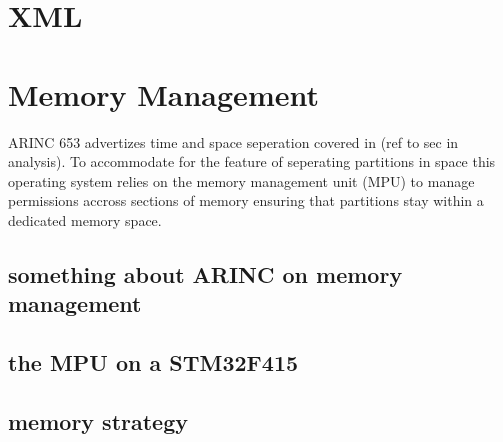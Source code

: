 \section{XML}


\section{Memory Management}
ARINC 653 advertizes time and space seperation covered in (ref to sec in analysis).
To accommodate for the feature of seperating partitions in space
this operating system relies on the memory management unit (MPU)
to manage permissions accross sections of memory
ensuring that partitions stay within a dedicated memory space.

\subsection{something about ARINC on memory management}

\subsection{the MPU on a STM32F415}

\subsection{memory strategy}
